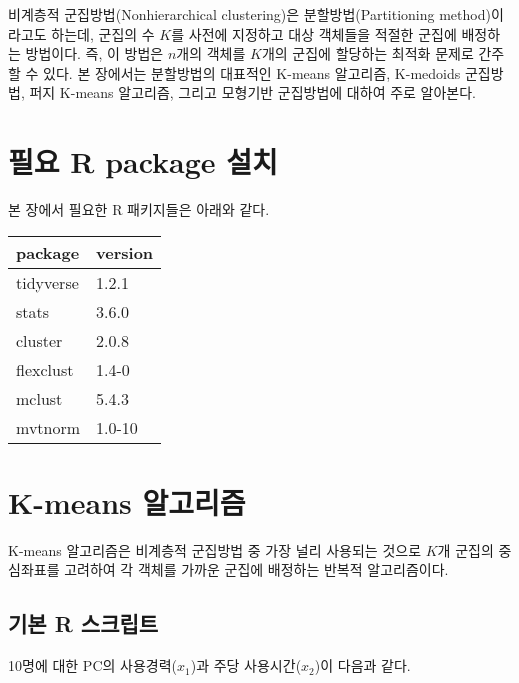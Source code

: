 \documentclass[]{book}
\begin{document}
비계층적 군집방법(Nonhierarchical clustering)은 분할방법(Partitioning method)이라고도 하는데, 군집의 수 \(K\)를 사전에 지정하고 대상 객체들을 적절한 군집에 배정하는 방법이다. 즉, 이 방법은 \(n\)개의 객체를 \(K\)개의 군집에 할당하는 최적화 문제로 간주할 수 있다. 본 장에서는 분할방법의 대표적인 K-means 알고리즘, K-medoids 군집방법, 퍼지 K-means 알고리즘, 그리고 모형기반 군집방법에 대하여 주로 알아본다.

\hypertarget{nonhierarchical-clustering-packages-install}{%
\section{필요 R package 설치}\label{nonhierarchical-clustering-packages-install}}

본 장에서 필요한 R 패키지들은 아래와 같다.

\begin{tabular}{l|l}
\hline
package & version\\
\hline
tidyverse & 1.2.1\\
\hline
stats & 3.6.0\\
\hline
cluster & 2.0.8\\
\hline
flexclust & 1.4-0\\
\hline
mclust & 5.4.3\\
\hline
mvtnorm & 1.0-10\\
\hline
\end{tabular}

\hypertarget{kmeans}{%
\section{K-means 알고리즘}\label{kmeans}}

K-means 알고리즘은 비계층적 군집방법 중 가장 널리 사용되는 것으로 \(K\)개 군집의 중심좌표를 고려하여 각 객체를 가까운 군집에 배정하는 반복적 알고리즘이다.

\hypertarget{kmeans-basic-script}{%
\subsection{기본 R 스크립트}\label{kmeans-basic-script}}

10명에 대한 PC의 사용경력(\(x_1\))과 주당 사용시간(\(x_2\))이 다음과 같다.
\end{document}
